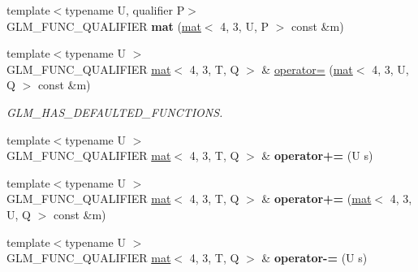 \begin{DoxyCompactItemize}
{\footnotesize template$<$typename U, qualifier P$>$ }\\G\+L\+M\+\_\+\+F\+U\+N\+C\+\_\+\+Q\+U\+A\+L\+I\+F\+I\+ER {\bfseries mat} (\hyperlink{structglm_1_1mat}{mat}$<$ 4, 3, U, P $>$ const \&m)
\item 
\mbox{\label{structglm_1_1mat_3_014_00_013_00_01T_00_01Q_01_4_a9048f333d24b6460a890ac768ae399ae}} 
{\footnotesize template$<$typename U $>$ }\\G\+L\+M\+\_\+\+F\+U\+N\+C\+\_\+\+Q\+U\+A\+L\+I\+F\+I\+ER \hyperlink{structglm_1_1mat}{mat}$<$ 4, 3, T, Q $>$ \& \hyperlink{structglm_1_1mat_3_014_00_013_00_01T_00_01Q_01_4_a9048f333d24b6460a890ac768ae399ae}{operator=} (\hyperlink{structglm_1_1mat}{mat}$<$ 4, 3, U, Q $>$ const \&m)
\begin{DoxyCompactList}\small\item\em G\+L\+M\+\_\+\+H\+A\+S\+\_\+\+D\+E\+F\+A\+U\+L\+T\+E\+D\+\_\+\+F\+U\+N\+C\+T\+I\+O\+NS. \end{DoxyCompactList}\item 
\mbox{\label{structglm_1_1mat_3_014_00_013_00_01T_00_01Q_01_4_ab093ab8d6e82815249f24bb79439fae2}} 
{\footnotesize template$<$typename U $>$ }\\G\+L\+M\+\_\+\+F\+U\+N\+C\+\_\+\+Q\+U\+A\+L\+I\+F\+I\+ER \hyperlink{structglm_1_1mat}{mat}$<$ 4, 3, T, Q $>$ \& {\bfseries operator+=} (U s)
\item 
\mbox{\label{structglm_1_1mat_3_014_00_013_00_01T_00_01Q_01_4_aef2c1c92ecc7a7780ef06345d516a8ef}} 
{\footnotesize template$<$typename U $>$ }\\G\+L\+M\+\_\+\+F\+U\+N\+C\+\_\+\+Q\+U\+A\+L\+I\+F\+I\+ER \hyperlink{structglm_1_1mat}{mat}$<$ 4, 3, T, Q $>$ \& {\bfseries operator+=} (\hyperlink{structglm_1_1mat}{mat}$<$ 4, 3, U, Q $>$ const \&m)
\item 
\mbox{\label{structglm_1_1mat_3_014_00_013_00_01T_00_01Q_01_4_ac8a6b92078e6005a122912cbfba7f108}} 
{\footnotesize template$<$typename U $>$ }\\G\+L\+M\+\_\+\+F\+U\+N\+C\+\_\+\+Q\+U\+A\+L\+I\+F\+I\+ER \hyperlink{structglm_1_1mat}{mat}$<$ 4, 3, T, Q $>$ \& {\bfseries operator-\/=} (U s)
\item 

\end{DoxyCompactItemize}
